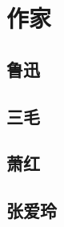 \documentclass[12pt,utf8]{book}
\begin{document}
% 


\part{作家}



\chapter{鲁迅}























\chapter{三毛}




\clearpage

% 
% 



\clearpage


\chapter{萧红}



% 






\chapter{张爱玲}











\end{document}
